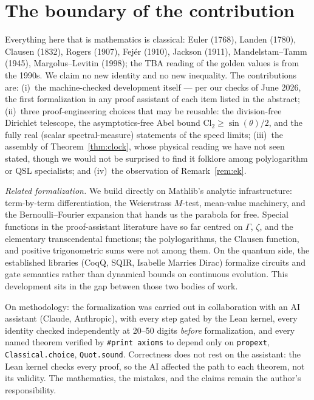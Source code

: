 \documentclass[11pt]{article}
\newcommand{\lean}[1]{\texttt{#1}}
\newcommand{\Cl}{\mathrm{Cl}_2}
\begin{document}
\section{The boundary of the contribution}\label{sec:boundary}

Everything here that is mathematics is classical: Euler (1768), Landen (1780), Clausen
(1832), Rogers (1907), Fej\'er (1910), Jackson (1911), Mandelstam--Tamm (1945),
Margolus--Levitin (1998); the TBA reading of the golden values is from the 1990s. We
claim no new identity and no new inequality. The contributions are:
(i)~the machine-checked development itself --- per our checks of June 2026, the first
formalization in any proof assistant of each item listed in the abstract;
(ii)~three proof-engineering choices that may be reusable: the division-free Dirichlet
telescope, the asymptotics-free Abel bound $\Cl\ge\sin(\theta)/2$, and the fully real
(scalar spectral-measure) statements of the speed limits;
(iii)~the assembly of Theorem~\ref{thm:clock}, whose physical reading we have not seen
stated, though we would not be surprised to find it folklore among polylogarithm or QSL
specialists; and (iv)~the observation of Remark~\ref{rem:ek}.

\emph{Related formalization.} We build directly on Mathlib's analytic infrastructure:
term-by-term differentiation, the Weierstrass $M$-test, mean-value machinery, and the
Bernoulli--Fourier expansion that hands us the parabola for free. Special functions in
the proof-assistant literature have so far centred on $\Gamma$, $\zeta$, and the
elementary transcendental functions; the polylogarithms, the Clausen function, and
positive trigonometric sums were not among them. On the quantum side, the established
libraries (CoqQ, SQIR, Isabelle Marries Dirac) formalize circuits and gate semantics
rather than dynamical bounds on continuous evolution. This development sits in the gap
between those two bodies of work.

On methodology: the formalization was carried out in collaboration with an AI assistant
(Claude, Anthropic), with every step gated by the Lean kernel, every identity checked
independently at 20--50 digits \emph{before} formalization, and every named theorem
verified by \lean{\#print axioms} to depend only on \lean{propext},
\lean{Classical.choice}, \lean{Quot.sound}. Correctness does not rest on the assistant:
the Lean kernel checks every proof, so the AI affected the path to each theorem, not its
validity. The mathematics, the mistakes, and the claims remain the author's
responsibility.
\end{document}
